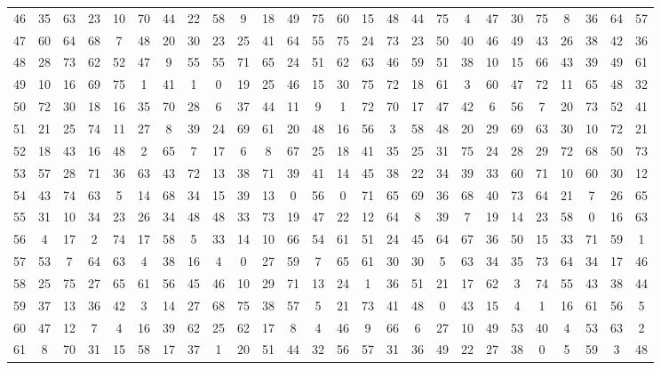 \begin{table}
\begin{tabular}{c c c c c c c c c c c c c c c c c c c c c c c c c c }
46 & 35 & 63 & 23 & 10 & 70 & 44 & 22 & 58 & 9 & 18 & 49 & 75 & 60 & 15 & 48 & 44 & 75 & 4 & 47 & 30 & 75 & 8 & 36 & 64 & 57 \\
47 & 60 & 64 & 68 & 7 & 48 & 20 & 30 & 23 & 25 & 41 & 64 & 55 & 75 & 24 & 73 & 23 & 50 & 40 & 46 & 49 & 43 & 26 & 38 & 42 & 36 \\
48 & 28 & 73 & 62 & 52 & 47 & 9 & 55 & 55 & 71 & 65 & 24 & 51 & 62 & 63 & 46 & 59 & 51 & 38 & 10 & 15 & 66 & 43 & 39 & 49 & 61 \\
49 & 10 & 16 & 69 & 75 & 1 & 41 & 1 & 0 & 19 & 25 & 46 & 15 & 30 & 75 & 72 & 18 & 61 & 3 & 60 & 47 & 72 & 11 & 65 & 48 & 32 \\
50 & 72 & 30 & 18 & 16 & 35 & 70 & 28 & 6 & 37 & 44 & 11 & 9 & 1 & 72 & 70 & 17 & 47 & 42 & 6 & 56 & 7 & 20 & 73 & 52 & 41 \\
51 & 21 & 25 & 74 & 11 & 27 & 8 & 39 & 24 & 69 & 61 & 20 & 48 & 16 & 56 & 3 & 58 & 48 & 20 & 29 & 69 & 63 & 30 & 10 & 72 & 21 \\
52 & 18 & 43 & 16 & 48 & 2 & 65 & 7 & 17 & 6 & 8 & 67 & 25 & 18 & 41 & 35 & 25 & 31 & 75 & 24 & 28 & 29 & 72 & 68 & 50 & 73 \\
53 & 57 & 28 & 71 & 36 & 63 & 43 & 72 & 13 & 38 & 71 & 39 & 41 & 14 & 45 & 38 & 22 & 34 & 39 & 33 & 60 & 71 & 10 & 60 & 30 & 12 \\
54 & 43 & 74 & 63 & 5 & 14 & 68 & 34 & 15 & 39 & 13 & 0 & 56 & 0 & 71 & 65 & 69 & 36 & 68 & 40 & 73 & 64 & 21 & 7 & 26 & 65 \\
55 & 31 & 10 & 34 & 23 & 26 & 34 & 48 & 48 & 33 & 73 & 19 & 47 & 22 & 12 & 64 & 8 & 39 & 7 & 19 & 14 & 23 & 58 & 0 & 16 & 63 \\
56 & 4 & 17 & 2 & 74 & 17 & 58 & 5 & 33 & 14 & 10 & 66 & 54 & 61 & 51 & 24 & 45 & 64 & 67 & 36 & 50 & 15 & 33 & 71 & 59 & 1 \\
57 & 53 & 7 & 64 & 63 & 4 & 38 & 16 & 4 & 0 & 27 & 59 & 7 & 65 & 61 & 30 & 30 & 5 & 63 & 34 & 35 & 73 & 64 & 34 & 17 & 46 \\
58 & 25 & 75 & 27 & 65 & 61 & 56 & 45 & 46 & 10 & 29 & 71 & 13 & 24 & 1 & 36 & 51 & 21 & 17 & 62 & 3 & 74 & 55 & 43 & 38 & 44 \\
59 & 37 & 13 & 36 & 42 & 3 & 14 & 27 & 68 & 75 & 38 & 57 & 5 & 21 & 73 & 41 & 48 & 0 & 43 & 15 & 4 & 1 & 16 & 61 & 56 & 5 \\
60 & 47 & 12 & 7 & 4 & 16 & 39 & 62 & 25 & 62 & 17 & 8 & 4 & 46 & 9 & 66 & 6 & 27 & 10 & 49 & 53 & 40 & 4 & 53 & 63 & 2 \\
61 & 8 & 70 & 31 & 15 & 58 & 17 & 37 & 1 & 20 & 51 & 44 & 32 & 56 & 57 & 31 & 36 & 49 & 22 & 27 & 38 & 0 & 5 & 59 & 3 & 48 \\

\end{tabular}
\end{table}
